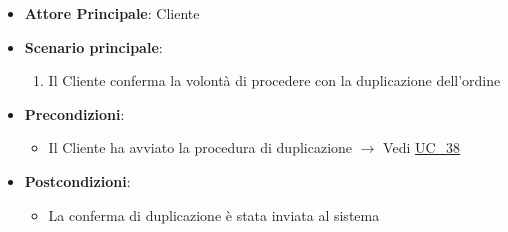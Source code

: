 \label{uc_38.1}

\begin{itemize}
    \item \textbf{Attore Principale}: Cliente
	\item \textbf{Scenario principale}:
	\begin{enumerate}
		\item Il Cliente conferma la volontà di procedere con la duplicazione dell'ordine
	\end{enumerate}
	\item \textbf{Precondizioni}:
	\begin{itemize}
		\item Il Cliente ha avviato la procedura di duplicazione $\rightarrow$ Vedi \hyperref[uc_38]{UC\_38}
	\end{itemize}
	\item \textbf{Postcondizioni}:
	\begin{itemize}
		\item La conferma di duplicazione è stata inviata al sistema
	\end{itemize}
\end{itemize}